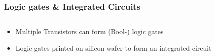 \documentclass{beamer}
\begin{document}
\begin{frame}\frametitle{Logic gates \& Integrated Circuits} 
\begin{columns}
\begin{column}{5cm}
\begin{itemize}
\item<1-> Multiple Transistors can form (Bool-) logic gates 
\item<2-> Logic gates printed on silicon wafer to form an integrated circuit
\end{itemize}
\end{column}
\begin{column}{6cm}
\begin{overprint}
%

\end{overprint}
\end{column}
\end{columns}
\end{frame}
\end{document}

